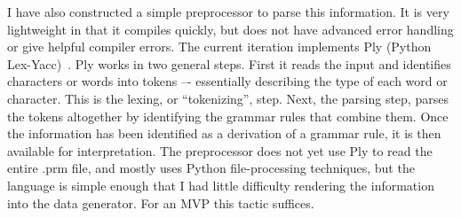I have also constructed a simple preprocessor to parse this information. It is very lightweight in that it compiles quickly, but does not have advanced error handling or give helpful compiler errors. The current iteration implements Ply (Python Lex-Yacc)~\cite{PythonLexYacc}. Ply works in two general steps. First it reads the input and identifies characters or words into tokens –- essentially describing the type of each word or character. This is the lexing, or ``tokenizing'', step. Next, the parsing step, parses the tokens altogether by identifying the grammar rules that combine them. Once the information has been identified as a derivation of a grammar rule, it is then available for interpretation. The preprocessor does not yet use Ply to read the entire .prm file, and mostly uses Python file-processing techniques, but the language is simple enough that I had little difficulty rendering the information into the data generator. For an MVP this tactic suffices.
